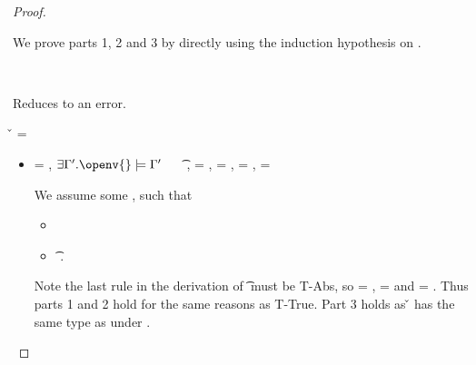 \begin{lemma}
\begin{proof}
\begin{case}[B-Let]
\begin{itemize}
\begin{subcase}[T-Let]
        We prove parts 1, 2 and 3 by directly using the induction hypothesis on .
      \end{subcase}
  \end{itemize}
\end{case}

\begin{case}[BE-Let]
  \ 
  
  Reduces to an error.
\end{case}

\begin{case}[B-Abs] 
        \v{} = {\closure {\openv{}} {\abs {\x{}} {\s{}} {}}}

  \begin{itemize}
    \item[]
      \begin{subcase}[T-Clos]
  \ep{} = {\closure {\openv{}} {\abs {\x{}} {\s{}} {}}},
  $\exists {\propenvp{}}. \satisfies{\openv{}}{\propenvp{}}$
  \ \ 
\judgementrewrite {\propenvp{}} {\abs {\x{}} {\s{}} {}} {\t{}}
                 {\filterset {\thenprop {\prop{f}}}
                             {}}
                 {}
                 {\abs {\x{}} {\s{}} {}},
  \e{} = {\closure {\openv{}} {\abs {\x{}} {\s{}} {}}},
                 {\thenprop{\prop{}}} = \topprop{},
                 {\elseprop{\prop{}}} = \botprop{},
                 {\object{}} = \emptyobject{}

        We assume some \propenvp{}, such that
        \begin{itemize}
          \item \satisfies{\openv{}}{\propenvp{}}
          \item \judgement {\propenvp{}} {\abs {\x{}} {\s{}} {}} {\t{}}
                           {\filterset {\thenprop {\prop{}}}
                                       {\elseprop {\prop{}}}}
                           {\object{}}.
       \end{itemize}
       Note the last rule in the derivation of
          \judgement {\propenvp{}} {\abs {\x{}} {\s{}} {}} {\t{}}
                           {\filterset {\thenprop {\prop{}}}
                                       {\elseprop {\prop{}}}}
                           {\object{}}
                           must be T-Abs, so 
                           {\thenprop {\prop{}}} = {\topprop{}},
                           {\elseprop {\prop{}}} = {\botprop{}}
                           and {\object{}} = {\emptyobject{}}.
         Thus parts 1 and 2 hold for the same reasons as T-True.
         Part 3 holds as \v{} has the same type as {\abs {\x{}} {\s{}} {}}
         under \propenvp{}.


\end{subcase}
\end{itemize}
\end{case}
\end{proof}
\end{lemma}
